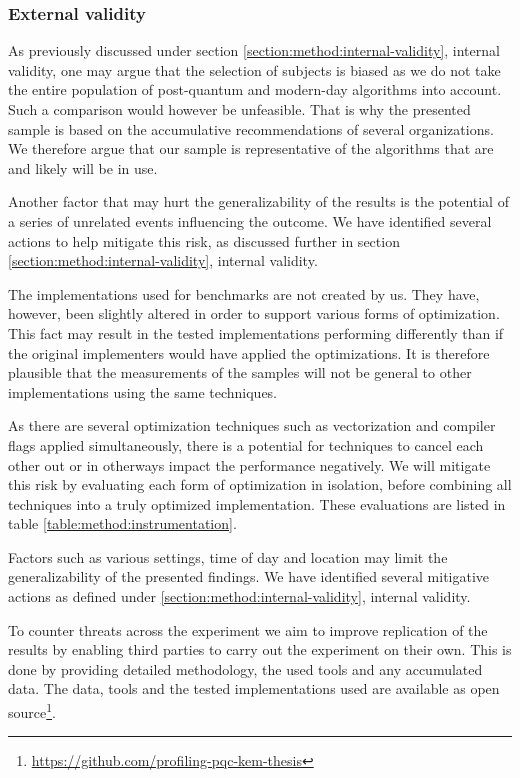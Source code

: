 \subsubsection{External validity}

As previously discussed under section \ref{section:method:internal-validity}, internal validity, one may argue that the selection of subjects is biased as we do not take the entire population of post-quantum and modern-day algorithms into account. Such a comparison would however be unfeasible. That is why the presented sample is based on the accumulative recommendations of several organizations. We therefore argue that our sample is representative of the algorithms that are and likely will be in use.

Another factor that may hurt the generalizability of the results is the potential of a series of unrelated events influencing the outcome. We have identified several actions to help mitigate this risk, as discussed further in section \ref{section:method:internal-validity}, internal validity.

The implementations used for benchmarks are not created by us. They have, however, been slightly altered in order to support various forms of optimization. This fact may result in the tested implementations performing differently than if the original implementers would have applied the optimizations. It is therefore plausible that the measurements of the samples will not be general to other implementations using the same techniques.

As there are several optimization techniques such as vectorization and compiler flags applied simultaneously, there is a potential for techniques to cancel each other out or in otherways impact the performance negatively. We will mitigate this risk by evaluating each form of optimization in isolation, before combining all techniques into a truly optimized implementation. These evaluations are listed in table \ref{table:method:instrumentation}.

Factors such as various settings, time of day and location may limit the generalizability of the presented findings. We have identified several mitigative actions as defined under \ref{section:method:internal-validity}, internal validity.

To counter threats across the experiment we aim to improve replication of the results by enabling third parties to carry out the experiment on their own. This is done by providing detailed methodology, the used tools and any accumulated data. The data, tools and the tested implementations used are available as open source\footnote{\href{https://github.com/profiling-pqc-kem-thesis}{https://github.com/profiling-pqc-kem-thesis}}.

